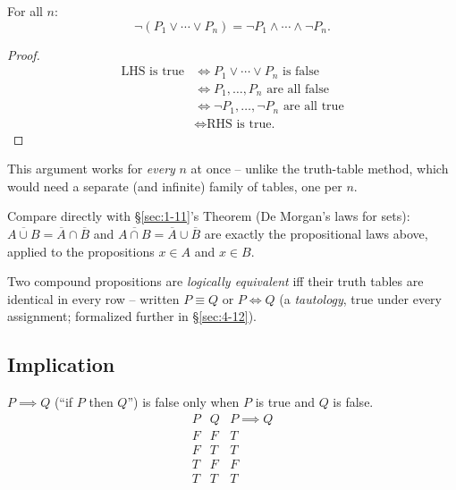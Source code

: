 \documentclass[11pt]{article}
\begin{document}
\bigskip
\begin{theorem}
For all $n$:
\[
\neg(P_1 \vee \cdots \vee P_n) = \neg P_1 \wedge \cdots \wedge \neg P_n.
\]
\end{theorem}
\begin{proof}
\begin{align*}
\text{LHS is true} &\iff P_1 \vee \cdots \vee P_n \text{ is false} \\
&\iff P_1,\dots,P_n \text{ are all false} \\
&\iff \neg P_1,\dots,\neg P_n \text{ are all true} \\
&\iff \text{RHS is true.}
\end{align*}
\end{proof}

\begin{note}
This argument works for \emph{every} $n$ at once -- unlike the truth-table method, which would need a separate (and infinite) family of tables, one per $n$.
\end{note}

\bigskip
\begin{note}
Compare directly with \S\ref{sec:1-11}'s Theorem (De Morgan's laws for sets): $\overline{A\cup B} = \overline A \cap \overline B$ and $\overline{A\cap B} = \overline A \cup \overline B$ are exactly the propositional laws above, applied to the propositions $x\in A$ and $x\in B$.
\end{note}

\bigskip
\begin{note}
Two compound propositions are \emph{logically equivalent} iff their truth tables are identical in every row -- written $P \equiv Q$ or $P \iff Q$ (a \emph{tautology}, true under every assignment; formalized further in \S\ref{sec:4-12}).
\end{note}

\subsection{Implication}
\label{sec:4-9}

\begin{definition}[Implication]
$P \implies Q$ (``if $P$ then $Q$'') is false only when $P$ is true and $Q$ is false.
\[
\begin{array}{cc|c}
P & Q & P \implies Q \\ \hline
F & F & T \\
F & T & T \\
T & F & F \\
T & T & T
\end{array}
\]
\end{definition}
\end{document}
